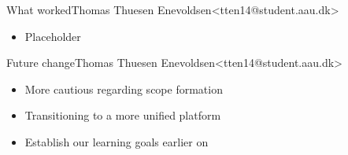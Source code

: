 \begin{frame}{What worked}{Thomas Thuesen Enevoldsen\newline<tten14@student.aau.dk>}
    \begin{itemize}
  	\item<2-> Placeholder
  \end{itemize}
\end{frame}

\begin{frame}{Future change}{Thomas Thuesen Enevoldsen\newline<tten14@student.aau.dk>}
    \begin{itemize}
  	\item More cautious regarding scope formation
  	\item Transitioning to a more unified platform
  	\item Establish our learning goals earlier on
  \end{itemize}
\end{frame}